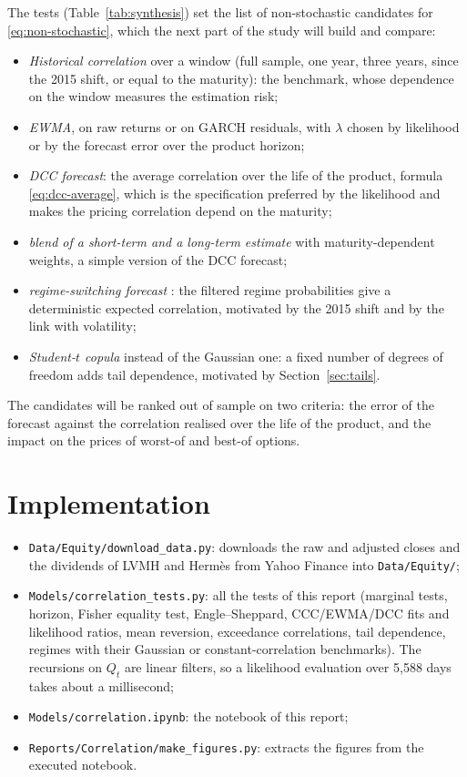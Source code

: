 \documentclass[11pt,a4paper]{article}
\newcommand{\code}[1]{\texttt{#1}}
\begin{document}
The tests (Table~\ref{tab:synthesis}) set the list of non-stochastic candidates for \eqref{eq:non-stochastic},
which the next part of the study will build and compare:
\begin{itemize}
\item \emph{Historical correlation} over a window (full sample, one year, three years, since the 2015 shift, or
equal to the maturity): the benchmark, whose dependence on the window measures the estimation risk;
\item \emph{EWMA}, on raw returns or on GARCH residuals, with $\lambda$ chosen by likelihood or by the forecast error
over the product horizon;
\item \emph{DCC forecast}: the average correlation over the life of the product, formula \eqref{eq:dcc-average},
which is the specification preferred by the likelihood and makes the pricing correlation depend on the maturity;
\item \emph{blend of a short-term and a long-term estimate} with maturity-dependent weights, a simple version of the
DCC forecast;
\item \emph{regime-switching forecast} \cite{hamilton1989}: the filtered regime probabilities give a deterministic
expected correlation, motivated by the 2015 shift and by the link with volatility;
\item \emph{Student-$t$ copula} instead of the Gaussian one: a fixed number of degrees of freedom adds tail
dependence, motivated by Section~\ref{sec:tails}.
\end{itemize}
The candidates will be ranked out of sample on two criteria: the error of the forecast against the correlation
realised over the life of the product, and the impact on the prices of worst-of and best-of options.

\section{Implementation}\label{sec:implementation}
\begin{itemize}
\item \code{Data/Equity/download\_data.py}: downloads the raw and adjusted closes and the dividends of LVMH and
Hermès from Yahoo Finance into \code{Data/Equity/};
\item \code{Models/correlation\_tests.py}: all the tests of this report (marginal tests, horizon, Fisher equality
test, Engle--Sheppard, CCC/EWMA/DCC fits and likelihood ratios, mean reversion, exceedance correlations, tail
dependence, regimes with their Gaussian or constant-correlation benchmarks). The recursions on $Q_t$ are linear
filters, so a likelihood evaluation over 5{,}588 days takes about a millisecond;
\item \code{Models/correlation.ipynb}: the notebook of this report;
\item \code{Reports/Correlation/make\_figures.py}: extracts the figures from the executed notebook.
\end{itemize}
\end{document}
